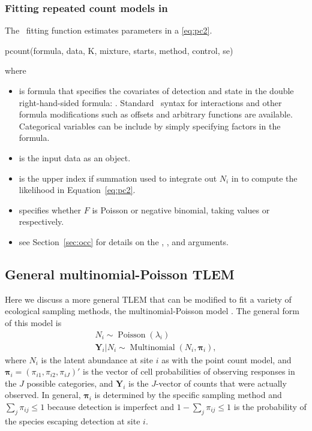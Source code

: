 \documentclass[article,shortnames]{jss}
\DeclareMathOperator{\Poi}{Poisson}
\DeclareMathOperator{\MN}{Multinomial}
\newcommand{\um}{\pkg{unmarked}}
\newcommand{\rlang}{\proglang{R}}
\begin{document}
\subsubsection[Fitting repeated count models in unmarked]{Fitting repeated count models in \um}

The \um\ fitting function  estimates parameters in a
\eqref{eq:pc2}.

\begin{Code}
pcount(formula, data, K, mixture, starts, method, control, se)
\end{Code}
where 
\begin{itemize}
\item {} is formula that specifies the covariates of
  detection and state in the double right-hand-sided formula: .  Standard \rlang\ syntax for
  interactions and other formula modifications such as offsets and
  arbitrary functions are available.  Categorical variables can be
  include by simply specifying factors in the formula.
\item {} is the input data as an
   object.
\item {} is the upper index if summation used to integrate out
  $N_{i}$ in to compute the likelihood in Equation~\eqref{eq:pc2}.
\item {} specifies whether $F$ is Poisson or negative
  binomial, taking values  or  respectively.
\item see Section~\ref{sec:occ} for details on the ,
  , and  arguments.
\end{itemize}

     
\subsection{General multinomial-Poisson TLEM}

Here we discuss a more general TLEM that can be modified to fit a
variety of ecological sampling methods, the multinomial-Poisson model
\citep{Royle2004a}.  The general form of this model is
\begin{gather}
  N_i \sim \Poi(\lambda_i) \label{eq:mp2} \\
  \mathbf Y_i|N_{i} \sim \MN(N_i, \boldsymbol \pi_i),
\end{gather}
where $N_i$ is the latent abundance at site $i$ as with the point
count model, and $\boldsymbol \pi_i=(\pi_{i1},\pi_{i2},\pi_{iJ})'$ is
the vector of cell probabilities of observing responses in the $J$
possible categories, and $\mathbf Y_{i}$ is the $J$-vector of counts
that were actually observed.  In general, $\boldsymbol \pi_i$ is
determined by the specific sampling method and
$\sum_{j} \pi_{ij} \le 1$ because detection is imperfect and
$1 - \sum_{j} \pi_{ij} \le 1$ is the probability of the species
escaping detection at site $i$.  
\end{document}
